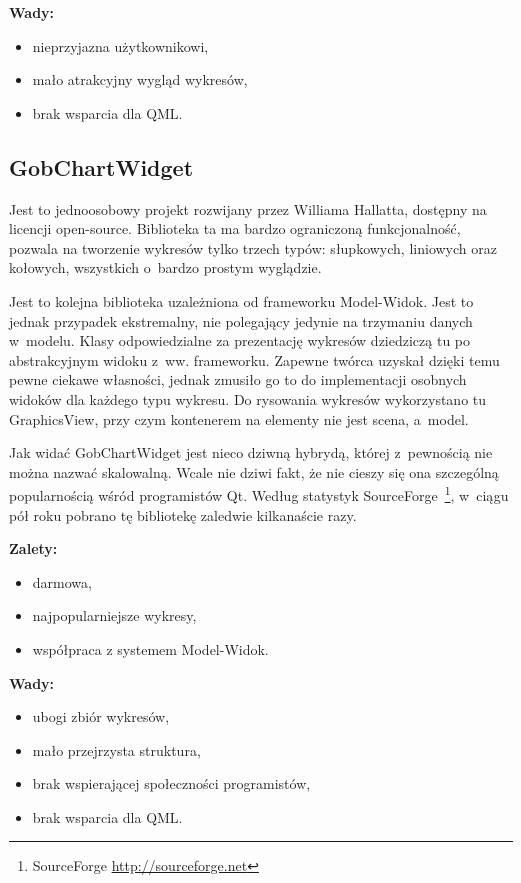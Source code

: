 \textbf{Wady:}
\begin{itemize}
\item{nieprzyjazna użytkownikowi,}
\item{mało atrakcyjny wygląd wykresów,}
\item{brak wsparcia dla QML.}
\end{itemize}

\subsection{GobChartWidget}
Jest to jednoosobowy projekt rozwijany przez Williama Hallatta, dostępny na licencji open-source. Biblioteka ta ma bardzo ograniczoną funkcjonalność, pozwala na tworzenie wykresów tylko trzech typów: słupkowych, liniowych oraz kołowych, wszystkich o~bardzo prostym wyglądzie.\newline

Jest to kolejna biblioteka uzależniona od frameworku Model-Widok. Jest to jednak przypadek ekstremalny, nie polegający jedynie na trzymaniu danych w~modelu. Klasy odpowiedzialne za prezentację wykresów dziedziczą tu po abstrakcyjnym widoku z~ww. frameworku. Zapewne twórca uzyskał dzięki temu pewne ciekawe własności, jednak zmusiło go to do implementacji osobnych widoków dla każdego typu wykresu.
Do rysowania wykresów wykorzystano tu GraphicsView, przy czym kontenerem na elementy nie jest scena, a~model.\newline

Jak widać GobChartWidget jest nieco dziwną hybrydą, której z~pewnością nie można nazwać skalowalną. Wcale nie dziwi fakt, że nie cieszy się ona szczególną popularnością wśród programistów Qt. Według statystyk SourceForge~\footnote{SourceForge \url{http://sourceforge.net}}, w~ciągu pół roku pobrano tę bibliotekę zaledwie kilkanaście razy.

\textbf{Zalety:}
\begin{itemize}
\item{darmowa,}
\item{najpopularniejsze wykresy,}
\item{współpraca z systemem Model-Widok.}\newline
\end{itemize}

\textbf{Wady:}
\begin{itemize}
\item{ubogi zbiór wykresów,}
\item{mało przejrzysta struktura,}
\item{brak wspierającej społeczności programistów,}
\item{brak wsparcia dla QML.}
\end{itemize}



